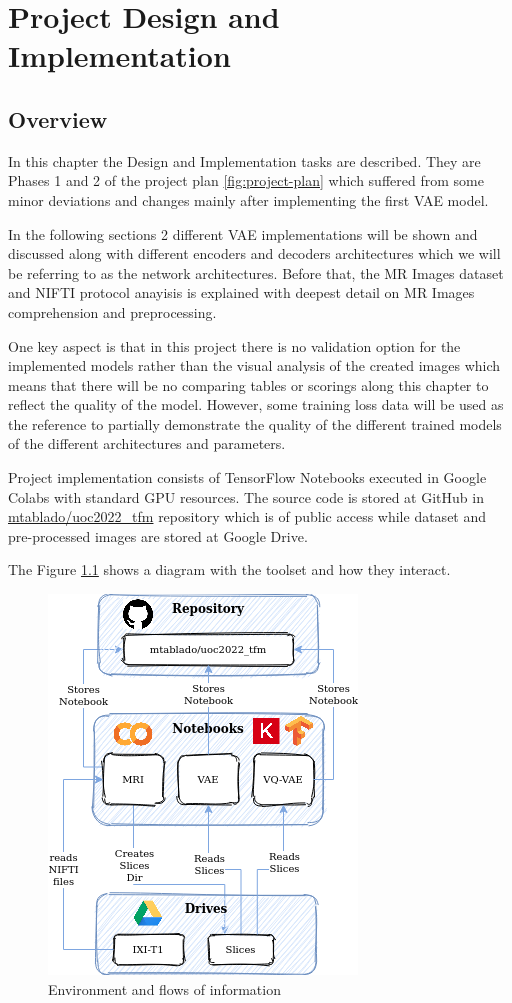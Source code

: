 \chapter{Project Design and Implementation}

\section{Overview}
\label{sec:imploverview}
In this chapter the Design and Implementation tasks are described. They are Phases 1 and 2 of the project plan \ref{fig:project-plan} which suffered from some minor deviations and changes mainly after implementing the first VAE model.

In the following sections 2 different VAE implementations will be shown and discussed along with different encoders and decoders architectures which we will be referring to as the network architectures. Before that, the MR Images dataset and NIFTI protocol anayisis is explained with deepest detail on MR Images comprehension and preprocessing.

One key aspect is that in this project there is no validation option for the implemented models rather than the visual analysis of the created images which means that there will be no comparing tables or scorings along this chapter to reflect the quality of the model. However, some  training loss data will be used as the reference to partially demonstrate the quality of the different trained models of the different architectures and parameters.   

Project implementation consists of TensorFlow Notebooks executed in Google Colabs with standard GPU resources. The source code is stored at GitHub in \href{https://github.com/mtablado/uoc2022_tfm}{mtablado/uoc2022\_tfm} repository which is of public access while  dataset and pre-processed images are stored at Google Drive.

The Figure \ref{fig:environment} shows a diagram with the toolset and how they interact.

\begin{figure}[ht]
    \centering
    \includegraphics[]{images/tfm-environment.png}
    \caption[Environment and flows of information]{Environment and flows of information}
    \label{fig:environment}
\end{figure}

